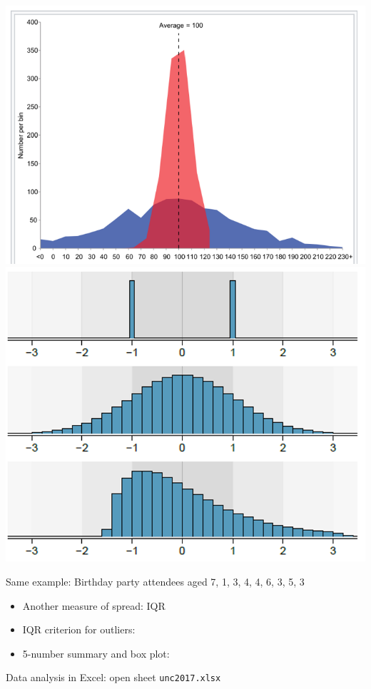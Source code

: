 \documentclass[11pt,letterpaper,twoside]{article}
\begin{document}
\includegraphics[scale=0.85]{images/sd.png} \hspace{15pt} \includegraphics[scale=0.7]{images/sd2.png} \vspace{60pt}

\newpage

Same example: Birthday party attendees aged 7, 1, 3, 4, 4, 6, 3, 5, 3

\begin{itemize}

\item Another measure of spread: IQR \vspace{240pt}

\item IQR criterion for outliers: \vspace{120pt}

\item 5-number summary and box plot:

\end{itemize}

\newpage

Data analysis in Excel: open sheet {\tt unc2017.xlsx}

\label{totalpag}
\end{document}
